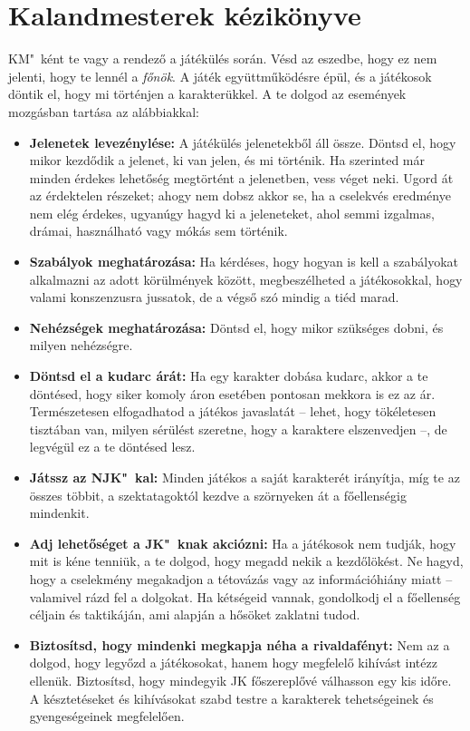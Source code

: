 \chapter{Kalandmesterek kézikönyve}

KM"~ként te vagy a rendező a játékülés során. Vésd az eszedbe, hogy ez nem jelenti, hogy te lennél a \emph{főnök}. A  játék együttműködésre épül, és a játékosok döntik el, hogy mi történjen a karakterükkel. A te dolgod az események mozgásban tartása az alábbiakkal:

\begin{itemize}
    \item \textbf{Jelenetek levezénylése:} A játékülés jelenetekből áll össze. Döntsd el, hogy mikor kezdődik a jelenet, ki van jelen, és mi történik. Ha szerinted már minden érdekes lehetőség megtörtént a jelenetben, vess véget neki. Ugord át az érdektelen részeket; ahogy nem dobsz akkor se, ha a cselekvés eredménye nem elég érdekes, ugyanúgy hagyd ki a jeleneteket, ahol semmi izgalmas, drámai, használható vagy mókás sem történik.
    \item \textbf{Szabályok meghatározása:} Ha kérdéses, hogy hogyan is kell a szabályokat alkalmazni az adott körülmények között, megbeszélheted a játékosokkal, hogy valami konszenzusra jussatok, de a végső szó mindig a tiéd marad.
    \item \textbf{Nehézségek meghatározása:} Döntsd el, hogy mikor szükséges dobni, és milyen nehézségre.
    \item \textbf{Döntsd el a kudarc árát:} Ha egy karakter dobása kudarc, akkor a te döntésed, hogy siker komoly áron esetében pontosan mekkora is ez az ár. Természetesen elfogadhatod a játékos javaslatát -- lehet, hogy tökéletesen tisztában van, milyen sérülést szeretne, hogy a karaktere elszenvedjen --, de legvégül ez a te döntésed lesz.
    \item \textbf{Játssz az NJK"~kal:} Minden játékos a saját karakterét irányítja, míg te az összes többit, a szektatagoktól kezdve a szörnyeken át a főellenségig mindenkit.
    \item \textbf{Adj lehetőséget a JK"~knak akciózni:} Ha a játékosok nem tudják, hogy mit is kéne tenniük, a te dolgod, hogy megadd nekik a kezdőlökést. Ne hagyd, hogy a cselekmény megakadjon a tétovázás vagy az információhiány miatt -- valamivel rázd fel a dolgokat. Ha kétségeid vannak, gondolkodj el a főellenség  céljain és taktikáján, ami alapján a hősöket zaklatni tudod.
    \item \textbf{Biztosítsd, hogy mindenki megkapja néha a rivaldafényt:} Nem az a dolgod, hogy legyőzd a játékosokat, hanem hogy megfelelő kihívást intézz ellenük. Biztosítsd, hogy mindegyik JK főszereplővé válhasson egy kis időre. A késztetéseket és kihívásokat szabd testre a karakterek tehetségeinek és gyengeségeinek megfelelően.

\end{itemize}
